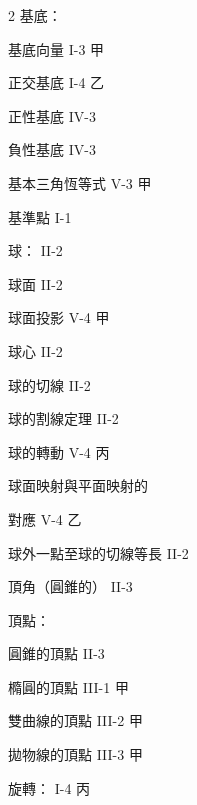 \begin{multicols}{2}
\noindent 基底：\par
\noindent\hspace*{1.5em} 基底向量 \hfill I-3 甲\par
\noindent\hspace*{1.5em} 正交基底 \hfill I-4 乙\par
\noindent\hspace*{1.5em} 正性基底 \hfill IV-3\par
\noindent\hspace*{1.5em} 負性基底 \hfill IV-3\par
\noindent 基本三角恆等式 \hfill V-3 甲\par
\noindent 基準點 \hfill I-1\par
\noindent 球： \hfill II-2\par
\noindent\hspace*{1.5em} 球面 \hfill II-2\par
\noindent\hspace*{1.5em} 球面投影 \hfill V-4 甲\par
\noindent\hspace*{1.5em} 球心 \hfill II-2\par
\noindent\hspace*{1.5em} 球的切線 \hfill II-2\par
\noindent\hspace*{1.5em} 球的割線定理 \hfill II-2\par
\noindent\hspace*{1.5em} 球的轉動 \hfill V-4 丙\par
\noindent\hspace*{1.5em} 球面映射與平面映射的\par
\noindent\hspace*{1.5em} 對應 \hfill V-4 乙\par
\noindent\hspace*{1.5em} 球外一點至球的切線等長 \hfill II-2\par
\noindent 頂角（圓錐的） \hfill II-3\par
\noindent 頂點：\par
\noindent\hspace*{1.5em} 圓錐的頂點 \hfill II-3\par
\noindent\hspace*{1.5em} 橢圓的頂點 \hfill III-1 甲\par
\noindent\hspace*{1.5em} 雙曲線的頂點 \hfill III-2 甲\par
\noindent\hspace*{1.5em} 拋物線的頂點 \hfill III-3 甲\par
\noindent 旋轉： \hfill I-4 丙\par


\end{multicols}
